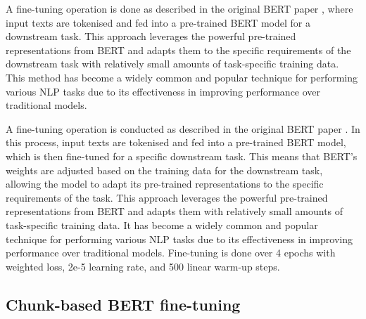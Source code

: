 A fine-tuning operation is done as described in the original BERT paper \cite{devlin-2019-bert}, where input texts are tokenised and fed into a pre-trained BERT model for a downstream task. This approach leverages the powerful pre-trained representations from BERT and adapts them to the specific requirements of the downstream task with relatively small amounts of task-specific training data. This method has become a widely common and popular technique for performing various NLP tasks due to its effectiveness in improving performance over traditional models.

A fine-tuning operation is conducted as described in the original BERT paper \cite{devlin-2019-bert}. In this process, input texts are tokenised and fed into a pre-trained BERT model, which is then fine-tuned for a specific downstream task. This means that BERT's weights are adjusted based on the training data for the downstream task, allowing the model to adapt its pre-trained representations to the specific requirements of the task. This approach leverages the powerful pre-trained representations from BERT and adapts them with relatively small amounts of task-specific training data. It has become a widely common and popular technique for performing various NLP tasks due to its effectiveness in improving performance over traditional models. Fine-tuning is done over 4 epochs with weighted loss, 2e-5 learning rate, and 500 linear warm-up steps.

\subsection{Chunk-based BERT fine-tuning}

